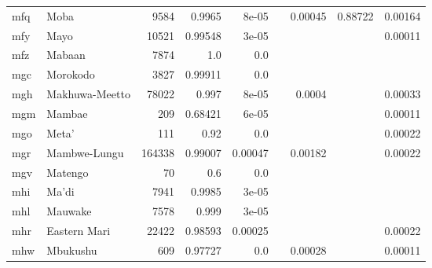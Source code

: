 \documentclass[11pt]{article}
\begin{document}
\begin{table*}[h]
{\begin{tabular}{llrrrrrrr}
mfq         & Moba         & 9584         & 0.9965         & 8e-05         &          & 0.00045         & 0.88722         & 0.00164         \\

mfy         & Mayo         & 10521         & 0.99548         & 3e-05         &          &          &          & 0.00011         \\

mfz         & Mabaan         & 7874         & 1.0         & 0.0         &          &          &          &          \\

mgc         & Morokodo         & 3827         & 0.99911         & 0.0         &          &          &          &          \\

mgh         & Makhuwa-Meetto         & 78022         & 0.997         & 8e-05         &          & 0.0004         &          & 0.00033         \\

mgm         & Mambae         & 209         & 0.68421         & 6e-05         &          &          &          & 0.00011         \\

mgo         & Meta'         & 111         & 0.92         & 0.0         &          &          &          & 0.00022         \\

mgr         & Mambwe-Lungu         & 164338         & 0.99007         & 0.00047         &          & 0.00182         &          & 0.00022         \\

mgv         & Matengo         & 70         & 0.6         & 0.0         &          &          &          &          \\

mhi         & Ma'di         & 7941         & 0.9985         & 3e-05         &          &          &          &          \\

mhl         & Mauwake         & 7578         & 0.999         & 3e-05         &          &          &          &          \\

mhr         & Eastern Mari         & 22422         & 0.98593         & 0.00025         &          &          &          & 0.00022         \\

mhw         & Mbukushu         & 609         & 0.97727         & 0.0         &          & 0.00028         &          & 0.00011         \\


\end{tabular}}
\end{table*}
\end{document}
